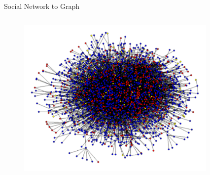 \begin{frame}[t]{Social Network to Graph}
    \begin{columns}
        \begin{column}{0.5\textwidth}
        \begin{figure}[h]
        \includegraphics[scale=0.25]{img/net.pdf}
        \end{figure}
        \end{column}
        \begin{column}{0.5\textwidth}
        \begin{figure}[h]

\end{figure}
\end{column}
\end{columns}
\end{frame}

